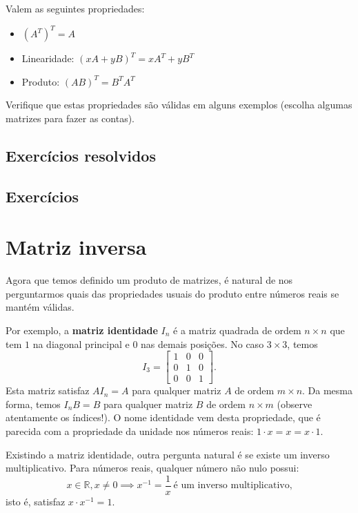 \documentclass[../livro.tex]{subfiles}  %
\begin{document}
Valem as seguintes propriedades:
\begin{itemize}
	\item $(A^T)^T = A$
	\item Linearidade: $(xA + y B)^T = x A^T + y B^T$
	\item Produto: $(AB)^T = B^T A^T$
\end{itemize}

\begin{exercise}
	Verifique que estas propriedades são válidas em alguns exemplos (escolha algumas matrizes para fazer as contas).
\end{exercise}


\subsection*{Exercícios resolvidos}

\construirExeresol

\subsection*{Exercícios}

\construirExer

\section{Matriz inversa}

Agora que temos definido um produto de matrizes, é natural de nos perguntarmos quais das propriedades usuais do produto entre números reais se mantém válidas.

Por exemplo, a \textbf{matriz identidade} $I_n$ é a matriz quadrada de ordem $n \times n$ que tem $1$ na diagonal principal e $0$ nas demais posições. No caso $3 \times 3$, temos
\begin{equation}
I_3 =
\left[
\begin{array}{ccc}
1 & 0 & 0 \\
0 & 1 & 0 \\
0 & 0 & 1 
\end{array}
\right].
\end{equation} Esta matriz satisfaz $A I_n = A$ para qualquer matriz $A$ de ordem $m \times n$. Da mesma forma, temos $I_n B = B$ para qualquer matriz $B$ de ordem $n \times m$ (observe atentamente os índices!). O nome identidade vem desta propriedade, que é parecida com a propriedade da unidade nos números reais: $1\cdot x = x = x\cdot 1$.

Existindo a matriz identidade, outra pergunta natural é se existe um inverso multiplicativo. Para números reais, qualquer número não nulo possui:
\begin{equation}
x \in \mathbb{R}, x \neq 0 \implies x^{-1} = \frac{1}{x} \ \text{é um inverso multiplicativo,}
\end{equation} isto é, satisfaz $x\cdot x^{-1} = 1$.
\end{document}
